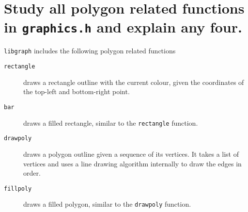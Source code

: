 \documentclass[a4paper,14pt,english,crop=false]{standalone}
\begin{document}
\section{Study all polygon related functions in \texttt{graphics.h} and explain any
  four.}
\texttt{libgraph} includes the following polygon related functions
\begin{description}
    \item [\texttt{rectangle}] {draws a rectangle outline with the current
        colour, given the coordinates of the top-left and bottom-right point.}
    \item [\texttt{bar}] {draws a filled rectangle, similar to the
        \texttt{rectangle} function.}
    \item [\texttt{drawpoly}] {draws a polygon outline given a sequence of its
      vertices.  It takes a list of vertices and uses a line drawing algorithm
      internally to draw the edges in order.}
    \item [\texttt{fillpoly}] {draws a filled polygon, similar to the
        \texttt{drawpoly} function.}
\end{description}
\end{document}
